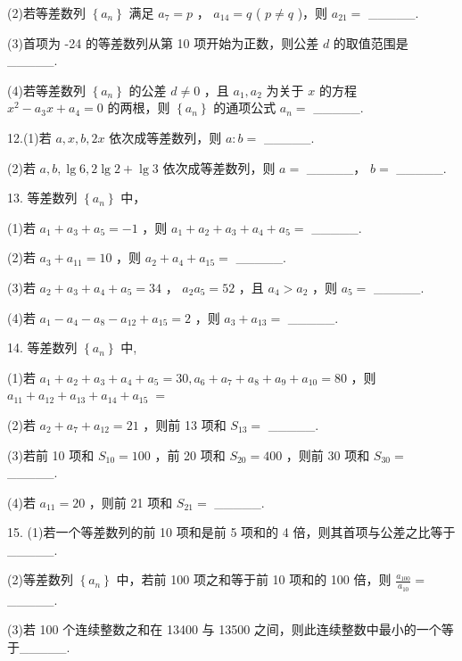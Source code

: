 \documentclass[10pt]{article}
\begin{document}
(2)若等差数列 \(\left\{  {a}_{n}\right\}\) 满足 \({a}_{7} = p\) ， \({a}_{14} = q\) ( \(p \neq  q\) )，则 \({a}_{21} =\) \_\_\_\_\_.

(3)首项为 -24 的等差数列从第 10 项开始为正数，则公差 \(d\) 的取值范围是\_\_\_\_\_.

(4)若等差数列 \(\left\{  {a}_{n}\right\}\) 的公差 \(d \neq  0\) ，且 \({a}_{1},{a}_{2}\) 为关于 \(x\) 的方程 \({x}^{2} - {a}_{3}x + {a}_{4} = 0\) 的两根，则 \(\left\{  {a}_{n}\right\}\) 的通项公式 \({a}_{n} =\) \_\_\_\_\_.

12.(1)若 \(a,x,b,{2x}\) 依次成等差数列，则 \(a : b =\) \_\_\_\_\_.

(2)若 \(a,b,\lg 6,{2\lg 2} + {\lg 3}\) 依次成等差数列，则 \(a =\) \_\_\_\_\_， \(b =\) \_\_\_\_\_.

13. 等差数列 \(\left\{  {a}_{n}\right\}\) 中，

(1)若 \({a}_{1} + {a}_{3} + {a}_{5} =  - 1\) ，则 \({a}_{1} + {a}_{2} + {a}_{3} + {a}_{4} + {a}_{5} =\) \_\_\_\_\_.

(2)若 \({a}_{3} + {a}_{11} = {10}\) ，则 \({a}_{2} + {a}_{4} + {a}_{15} =\) \_\_\_\_\_.

(3)若 \({a}_{2} + {a}_{3} + {a}_{4} + {a}_{5} = {34}\) ， \({a}_{2}{a}_{5} = {52}\) ，且 \({a}_{4} > {a}_{2}\) ，则 \({a}_{5} =\) \_\_\_\_\_.

(4)若 \({a}_{1} - {a}_{4} - {a}_{8} - {a}_{12} + {a}_{15} = 2\) ，则 \({a}_{3} + {a}_{13} =\) \_\_\_\_\_.

14. 等差数列 \(\left\{  {a}_{n}\right\}\) 中,

(1)若 \({a}_{1} + {a}_{2} + {a}_{3} + {a}_{4} + {a}_{5} = {30},{a}_{6} + {a}_{7} + {a}_{8} + {a}_{9} + {a}_{10} = {80}\) ，则 \({a}_{11} + {a}_{12} + {a}_{13} + {a}_{14} + {a}_{15} \; =\)

(2)若 \({a}_{2} + {a}_{7} + {a}_{12} = {21}\) ，则前 13 项和 \({S}_{13} =\) \_\_\_\_\_.

(3)若前 10 项和 \({S}_{10} = {100}\) ，前 20 项和 \({S}_{20} = {400}\) ，则前 30 项和 \({S}_{30} =\) \_\_\_\_\_.

(4)若 \({a}_{11} = {20}\) ，则前 21 项和 \({S}_{21} =\) \_\_\_\_\_.

15. (1)若一个等差数列的前 10 项和是前 5 项和的 4 倍，则其首项与公差之比等于\_\_\_\_\_.

(2)等差数列 \(\left\{  {a}_{n}\right\}\) 中，若前 100 项之和等于前 10 项和的 100 倍，则 \(\frac{{a}_{100}}{{a}_{10}} =\) \_\_\_\_\_.

(3)若 100 个连续整数之和在 13400 与 13500 之间，则此连续整数中最小的一个等于\_\_\_\_\_.
\end{document}
